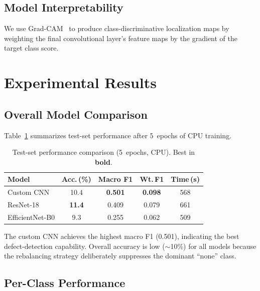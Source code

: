 \documentclass[conference]{IEEEtran}
\begin{document}
\subsection{Model Interpretability}

We use Grad-CAM~\cite{selvaraju2017} to produce class-discriminative
localization maps by weighting the final convolutional layer's feature maps by
the gradient of the target class score.

\section{Experimental Results}
\label{sec:results}

\subsection{Overall Model Comparison}

Table~\ref{tab:model_comparison} summarizes test-set performance after
5~epochs of CPU training.

\begin{table}[H]
\centering
\caption{Test-set performance comparison (5~epochs, CPU). Best in \textbf{bold}.}
\label{tab:model_comparison}
\begin{tabular}{@{}lcccc@{}}
\toprule
\textbf{Model} & \textbf{Acc.\,(\%)} & \textbf{Macro F1}
               & \textbf{Wt.\,F1} & \textbf{Time\,(s)} \\
\midrule
Custom CNN       & 10.4 & \textbf{0.501} & \textbf{0.098} & 568 \\
ResNet-18        & \textbf{11.4} & 0.409 & 0.079 & 661 \\
EfficientNet-B0  & 9.3 & 0.255 & 0.062 & 509 \\
\bottomrule
\end{tabular}
\end{table}

The custom CNN achieves the highest macro F1 (0.501), indicating the best
defect-detection capability. Overall accuracy is low ($\sim$10\%) for all
models because the rebalancing strategy deliberately suppresses the dominant
``none'' class.

\subsection{Per-Class Performance}
\end{document}
